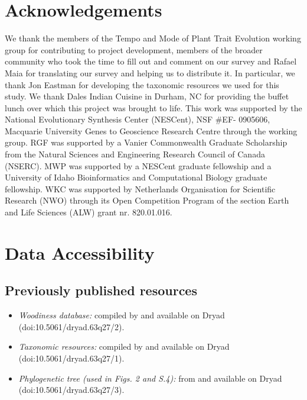 \documentclass[a4paper,12pt]{article}
\begin{document}
\section{Acknowledgements}

We thank the members of the Tempo and Mode of Plant Trait
Evolution working group for contributing to project development,
members of the broader community who took the time to fill out and
comment on our survey and Rafael Maia for translating our survey and
helping us to distribute it.  In particular, we thank Jon Eastman for 
developing the taxonomic resources we used for this study.
%
We thank Dales Indian Cuisine in Durham, NC for providing the buffet
lunch over which this project was brought to life.
%
This work was supported by the National Evolutionary Synthesis Center
(NESCent), NSF \#EF- 0905606, Macquarie University Genes to Geoscience
Research Centre through the working group.
%
RGF was supported by a Vanier Commonwealth Graduate Scholarship from
the Natural Sciences and Engineering Research Council of Canada
(NSERC).  MWP was supported by a NESCent graduate fellowship and a
University of Idaho Bioinformatics and Computational Biology graduate
fellowship.
%
WKC was supported by Netherlands Organisation for
Scientific Research (NWO) through its Open Competition Program of the
section Earth and Life Sciences (ALW) grant nr. 820.01.016.

\section{Data Accessibility}
\subsection{Previously published resources}
\begin{itemize}
\item \textit{Woodiness database:} compiled by \citet{Zanne} and available on
Dryad (doi:10.5061/dryad.63q27/2).
\item \textit{Taxonomic resources:} compiled by \citet{Zanne} and available on
Dryad (doi:10.5061/dryad.63q27/1).
\item \textit{Phylogenetic tree (used in Figs. 2 and S.4):} from \citet{Zanne} and
available on Dryad (doi:10.5061/dryad.63q27/3).
\end{itemize}
\end{document}
